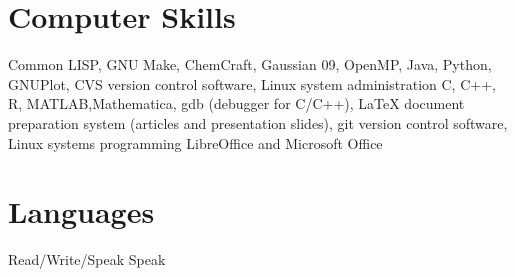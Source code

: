 \documentclass [a4paper,11pt]{moderncv}
\begin{document}
\section{Computer Skills}
 {Common LISP, GNU Make, ChemCraft, Gaussian 09, OpenMP, Java, Python, GNUPlot, CVS version control software,  Linux system administration}
 {C, C++, R, MATLAB,Mathematica, gdb (debugger for C/C++), \LaTeX \hspace{1pt} document preparation system (articles and presentation slides), git version control software, Linux systems programming}
 {LibreOffice and Microsoft Office}

\section{Languages}
 {Read/Write/Speak}
 {Speak}
\end{document}
